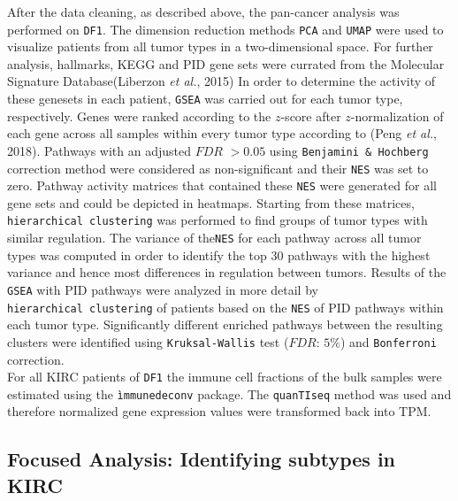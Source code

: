 \documentclass[
  parskip,
  oneside]{\documentclass[oneside]{book}}
\begin{document}
After the data cleaning, as described above, the pan-cancer analysis was
performed on \texttt{DF1}. The dimension reduction methods \texttt{PCA}
and \texttt{UMAP} were used to visualize patients from all tumor types
in a two-dimensional space. For further analysis, hallmarks, KEGG and
PID gene sets were currated from the Molecular Signature
Database(Liberzon \emph{et al.}, 2015) In order to determine the
activity of these genesets in each patient, \texttt{GSEA} was carried
out for each tumor type, respectively. Genes were ranked according to
the \(z\)-score after \(z\)-normalization of each gene across all
samples within every tumor type according to (Peng \emph{et al.}, 2018).
Pathways with an adjusted \(FDR\) \(>0.05\) using
\texttt{Benjamini\ \&\ Hochberg} correction method were considered as
non-significant and their \texttt{NES} was set to zero. Pathway activity
matrices that contained these \texttt{NES} were generated for all gene
sets and could be depicted in heatmaps. Starting from these matrices,
\texttt{hierarchical\ clustering} was performed to find groups of tumor
types with similar regulation. The variance of the\texttt{NES} for each
pathway across all tumor types was computed in order to identify the top
30 pathways with the highest variance and hence most differences in
regulation between tumors. Results of the \texttt{GSEA} with PID
pathways were analyzed in more detail by
\texttt{hierarchical\ clustering} of patients based on the \texttt{NES}
of PID pathways within each tumor type. Significantly different enriched
pathways between the resulting clusters were identified using
\texttt{Kruksal-Wallis} test (\(FDR\): \(5\%\)) and \texttt{Bonferroni}
correction.\\
For all KIRC patients of \texttt{DF1} the immune cell fractions of the
bulk samples were estimated using the \texttt{ìmmunedeconv} package. The
\texttt{quanTIseq} method was used and therefore normalized gene
expression values were transformed back into TPM.

\hypertarget{focused-analysis-identifying-subtypes-in-kirc}{%
\subsection{Focused Analysis: Identifying subtypes in
KIRC}\label{focused-analysis-identifying-subtypes-in-kirc}}
\end{document}
